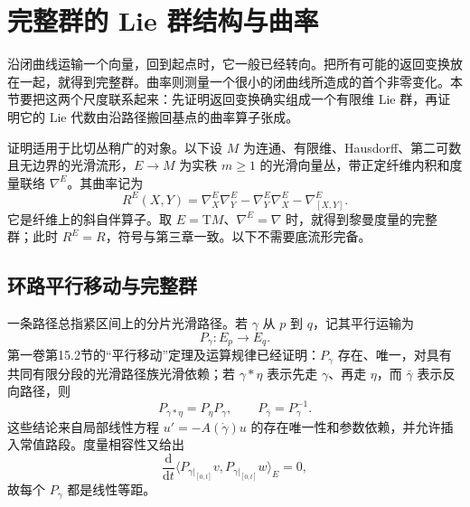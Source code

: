 
% 
% 

\section{完整群的 Lie 群结构与曲率}
\label{g3:sec:0501}

沿闭曲线运输一个向量，回到起点时，它一般已经转向。把所有可能的返回变换放在一起，就得到完整群。曲率则测量一个很小的闭曲线所造成的首个非零变化。本节要把这两个尺度联系起来：先证明返回变换确实组成一个有限维 Lie 群，再证明它的 Lie 代数由沿路径搬回基点的曲率算子张成。

\ProseParagraphBreak

证明适用于比切丛稍广的对象。以下设 \(M\) 为连通、有限维、Hausdorff、第二可数且无边界的光滑流形，\(E\to M\) 为实秩 \(m\geq1\) 的光滑向量丛，带正定纤维内积和度量联络 \(\nabla^E\)。其曲率记为
\[
	R^E(X,Y)=\nabla^E_X\nabla^E_Y-\nabla^E_Y\nabla^E_X-\nabla^E_{[X,Y]}.
\]
它是纤维上的斜自伴算子。取 \(E=\mathrm TM\)、\(\nabla^E=\nabla\) 时，就得到黎曼度量的完整群；此时 \(R^E=R\)，符号与第三章一致。以下不需要底流形完备。

\subsection{环路平行移动与完整群}
\label{g3:subsec:0501:01}

一条路径总指紧区间上的分片光滑路径。若 \(\gamma\) 从 \(p\) 到 \(q\)，记其平行运输为
\[
	P_\gamma:E_p\longrightarrow E_q.
\]
第一卷第15.2节的“平行移动”定理及运算规律已经证明：\(P_\gamma\) 存在、唯一，对具有共同有限分段的光滑路径族光滑依赖；若 \(\gamma*\eta\) 表示先走 \(\gamma\)、再走 \(\eta\)，而 \(\bar\gamma\) 表示反向路径，则
\begin{equation}\label{g3:eq:holonomy-transport-laws}
	P_{\gamma*\eta}=P_\eta P_\gamma,
	\qquad P_{\bar\gamma}=P_\gamma^{-1}.
\end{equation}
这些结论来自局部线性方程 \(u'=-A(\dot\gamma)u\) 的存在唯一性和参数依赖，并允许插入常值路段。度量相容性又给出
\[
	\frac{\mathrm d}{\mathrm dt}\langle P_{\gamma|_{[0,t]}}v,P_{\gamma|_{[0,t]}}w\rangle_E=0,
\]
故每个 \(P_\gamma\) 都是线性等距。

